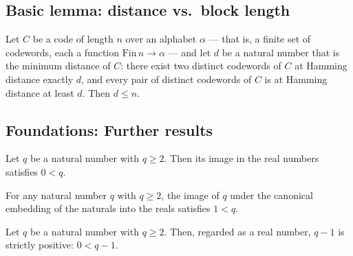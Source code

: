 \subsection{Basic lemma: distance vs.\ block length}

\begin{lemma}
\label{ErrorCorrectingCodes.Codeword.dist_le_length}
\leanok
{}
Let $C$ be a code of length $n$ over an alphabet $\alpha$ — that is, a finite set of
codewords, each a function $\mathrm{Fin}\,n \to \alpha$ — and let $d$ be a natural
number that is the minimum distance of $C$: there exist two distinct codewords of $C$ at
Hamming distance exactly $d$, and every pair of distinct codewords of $C$ is at Hamming
distance at least $d$. Then $d \le n$.
\end{lemma}

\subsection*{Foundations: Further results}

\begin{lemma}
\label{ErrorCorrectingCodes.Codeword.natCast_pos_of_two_le}
\leanok
{}
Let $q$ be a natural number with $q \ge 2$. Then its image in the real numbers satisfies
$0 < q$.
\end{lemma}

\begin{lemma}
\label{ErrorCorrectingCodes.Codeword.natCast_one_lt_of_two_le}
\leanok
{}
For any natural number $q$ with $q \ge 2$, the image of $q$ under the canonical
embedding of the naturals into the reals satisfies $1 < q$.
\end{lemma}

\begin{lemma}
\label{ErrorCorrectingCodes.Codeword.natCast_sub_one_pos_of_two_le}
\leanok
{}
Let $q$ be a natural number with $q \ge 2$. Then, regarded as a real number, $q - 1$ is
strictly positive: $0 < q - 1$.
\end{lemma}

